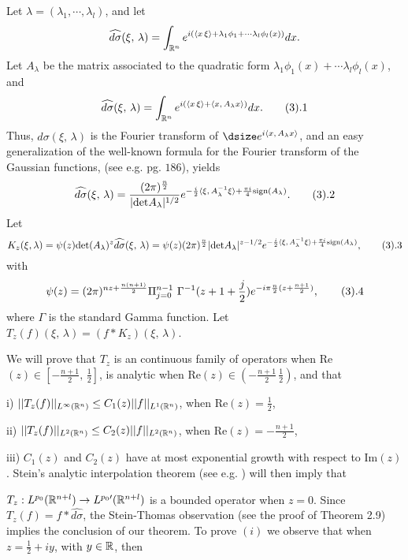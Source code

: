Let $\lambda = (\lambda_1,\cdots, \lambda_l)$, and let
$$
\widehat{d\sigma}(\xi,\,\lambda) =
\int_{{\Bbb R}^n} e^{i(
\langle x\,\xi\rangle+ \lambda_1{\phi}_1+\cdots \lambda_l{\phi}_l(x))}dx.
$$
Let $A_\lambda$ be the matrix associated to the quadratic form  
$ \lambda_1{\phi}_1(x)+\cdots \lambda_l{\phi}_l(x)$, and 
$$
\widehat{d\sigma}(\xi,\,\lambda) =
\int_{{\Bbb R}^n} e^{i(
\langle x\,\xi\rangle+ \langle x, \, A_\lambda x\rangle)}dx.
\tag 3.1
$$
Thus, $\widehat{d\sigma}(\xi,\,\lambda)$ is the Fourier transform of 
$\dsize e^{i \langle x, \, A_\lambda x\rangle}$,  and  an easy generalization 
of the well-known formula  for the  Fourier transform of the Gaussian
functions, (see e.g.\cite{WR} pg. $186$), yields
$$
\widehat{d\sigma}(\xi,\,\lambda) = 
\frac{(2\pi)^{\frac{n}{2}}}{|\text{det}A_\lambda|^{1/2}}
e^{-\frac{i}{2}\langle \xi,\, A_\lambda^{-1} \xi\rangle+\frac{\pi i}{4}
\text{sign}(A_\lambda)}.
\tag 3.2
$$
Let
$$
K_z(\xi,\lambda)=\psi(z)
\text{det}(A_\lambda)^{z}\widehat{d\sigma}(\xi,\,\lambda)
=
\psi(z)(2\pi)^{\frac{n}{2}}|\text{det}A_\lambda|^{z-1/2}
e^{-\frac{i}{2}\langle \xi,\, A_\lambda^{-1} \xi\rangle +\frac{\pi i}{4}
\text{sign}(A_\lambda)},
\tag 3.3
$$
with 
$$
\psi(z)=(2\pi)^{nz+\frac{n(n+1)}{2}} \Pi_{j=0}^{n-1}\
\Gamma^{-1}(z+1+\frac{j}{2}) 
e^{-i\pi\frac{n}{2}(z+\frac{n+1}{2})},
\tag 3.4
$$ 
where $\Gamma$ is the standard Gamma function.
Let $T_z(f)(\xi,\,\lambda)= (f*K_z)(\xi,\,\lambda)$.
\par
We will prove that $T_z$ is an continuous family of operators when 
Re$(z) \in [-\frac{n+1}{2},\,  \frac{1}{2}]$, is analytic  
when Re$(z) \in (-\frac{n+1}{2}\, \frac{1}{2})$,
and that
\bigskip
\item{i)}
$||T_z(f)||_{L^\infty({\Bbb R}^n)} \leq C_1(z)||f||_{L^1({\Bbb R}^n)} $, 
when Re$(z) =\frac{1}{2}$,
\item{ii)}
$||T_z(f)||_{L^2({\Bbb R}^n)} \leq C_2(z)||f||_{L^2({\Bbb R}^n)}$, when 
Re$(z)=- \frac{n+1}{2}$,
 \item{iii)}
$C_1(z)$ and $C_2(z)$ have at most exponential growth with respect to Im$(z)$. 
\bigskip
\noindent
Stein's analytic
interpolation theorem (see e.g. \cite{So})  will then imply  that 
\par
\noindent
$T_z : L^{p_0}({\Bbb R}^{n+l})\to L^{p_0\prime}({\Bbb R}^{n+l})$ 
is a bounded operator  
when  $z=0$. 
Since $T_z(f)= f*\widehat{d\sigma}$, the Stein-Thomas observation 
(see the proof of Theorem 2.9) implies the conclusion of our theorem.
\bigskip
To prove $(i)$  
we observe that when $z =\frac{1}{2}+iy$, with $y\in {\Bbb R}$, then   
